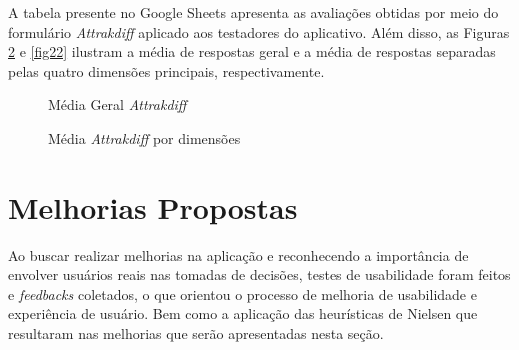 A tabela presente no Google Sheets apresenta as avaliações obtidas por meio do formulário \textit{Attrakdiff} aplicado aos testadores do aplicativo. Além disso, as Figuras \ref{fig21} e \ref{fig22} ilustram a média de respostas geral e a média 
de respostas separadas pelas quatro dimensões principais, respectivamente.

\begin{figure}[h!]
	\centering
	\caption{Média Geral \textit{Attrakdiff}}
	\label{fig20}
\end{figure}

\begin{figure}[h!]
	\centering
	\caption{Média \textit{Attrakdiff} por dimensões}
	\label{fig21}
\end{figure}

\section{Melhorias Propostas}
\label{sec:Melhorias Propostas}
Ao buscar realizar melhorias na aplicação e reconhecendo a importância de envolver usuários reais nas tomadas de decisões, testes de usabilidade foram feitos e \textit{feedbacks} coletados, 
o que orientou o processo de melhoria de usabilidade e experiência de usuário. Bem como a aplicação das heurísticas de Nielsen que resultaram nas melhorias que serão apresentadas nesta seção.

